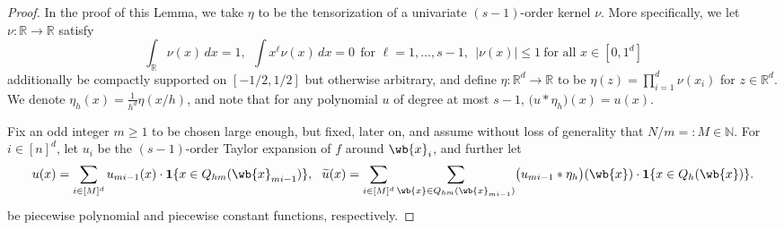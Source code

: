\documentclass{article}
\newcommand{\Reals}{\mathbb{R}}
\newcommand{\abs}[1]{\left \lvert #1 \right \rvert}
\newcommand{\1}{\mathbf{1}}
\newcommand{\wt}[1]{\widetilde{#1}}
\theoremstyle{alden}
\theoremstyle{aldenthm}
\theoremstyle{definition}
\theoremstyle{remark}
\begin{document}
\begin{proof}
	In the proof of this Lemma, we take $\eta$ to be the tensorization of a univariate $(s - 1)$-order kernel $\nu$. More specifically, we let $\nu: \Reals \to \Reals$ satisfy
	\begin{equation*}
	\int_{\Reals} \nu(x) \,dx = 1,~~ \int x^{\ell} \nu(x) \,dx = 0~~\textrm{for $\ell = 1,\ldots,s-1$},~~ \abs{\nu(x)} \leq 1~\textrm{for all $x \in [0,1^d]$}
	\end{equation*}
	additionally be compactly supported on $[-1/2,1/2]$ but otherwise arbitrary, and define $\eta:\Reals^d \to \Reals$ to be $\eta(z) = \prod_{i = 1}^{d} \nu(x_i)$ for $z \in \Reals^d$. We denote $\eta_h(x) = \frac{1}{h^d} \eta(x/h)$, and note that for any polynomial $u$ of degree at most $s - 1$, $\bigl(u \ast \eta_h\bigr)(x) = u(x)$. 
	
	Fix an odd integer $m \geq 1$ to be chosen large enough, but fixed, later on, and assume without loss of generality that $N/m =: M \in \mathbb{N}$. For $i \in [n]^d$, let $u_{i}$ be the $(s - 1)$-order Taylor expansion of $f$ around $\wb{x}_i$, and further let
	\begin{align*}
	u(x) = \sum_{i \in [M]^d} u_{mi - 1}(x) \cdot \1\{x \in Q_{hm}(\wb{x}_{mi - 1})  \},~~ \wt{u}(x) = \sum_{i \in [M]^d} \sum_{\wb{x} \in  Q_{hm}(\wb{x}_{mi - 1})} \bigl(u_{mi - 1} \ast \eta_h\bigr)(\wb{x}) \cdot \1\{x \in Q_{h}(\wb{x})  \}.
	\end{align*}
	be piecewise polynomial and piecewise constant functions, respectively.
	

\end{proof}
\end{document}
